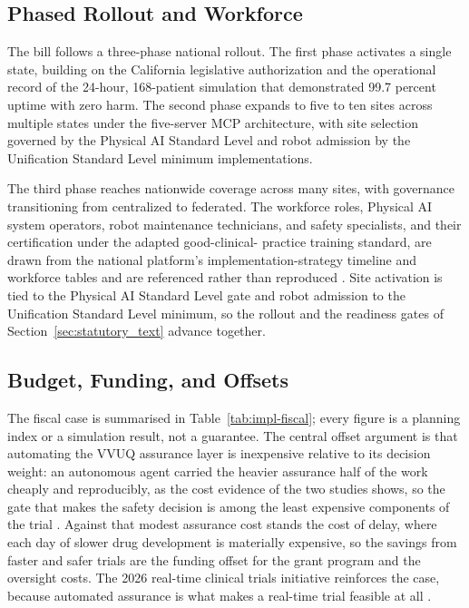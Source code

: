\subsection{Phased Rollout and Workforce}

The bill follows a three-phase national rollout. The first phase activates a
single state, building on the California legislative authorization and the
operational record of the 24-hour, 168-patient simulation that demonstrated 99.7
percent uptime with zero harm. The second phase expands to five to ten sites
across multiple states under the five-server MCP architecture, with site
selection governed by the Physical AI Standard Level and robot admission by the
Unification Standard Level minimum implementations. 

The third phase reaches nationwide coverage
across many sites, with governance transitioning from centralized to federated.
The workforce roles, Physical AI system operators, robot maintenance technicians,
and safety specialists, and their certification under the adapted good-clinical-
practice training standard, are drawn from the national platform's
implementation-strategy timeline and workforce tables and are referenced rather
than reproduced \cite{kawchak2026national, kawchak2026sitedocs}. Site activation
is tied to the Physical AI Standard Level gate and robot admission to the
Unification Standard Level minimum, so the rollout and the readiness gates of
Section~\ref{sec:statutory_text} advance together.

\subsection{Budget, Funding, and Offsets}

The fiscal case is summarised in Table~\ref{tab:impl-fiscal}; every figure is a
planning index or a simulation result, not a guarantee. The central offset
argument is that automating the VVUQ assurance layer is inexpensive relative to
its decision weight: an autonomous agent carried the heavier assurance half of
the work cheaply and reproducibly, as the cost evidence of the two studies shows,
so the gate that makes the safety decision is among the least expensive
components of the trial \cite{kawchak2026vvuq01, kawchak2026vvuq02}. Against that
modest assurance cost stands the cost of delay, where each day of slower drug
development is materially expensive, so the savings from faster and safer trials
are the funding offset for the grant program and the oversight costs. The 2026
real-time clinical trials initiative reinforces the case, because automated
assurance is what makes a real-time trial feasible at all \cite{fda2026realtime}.


